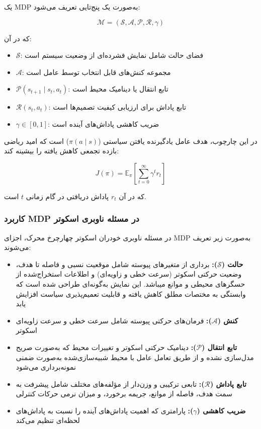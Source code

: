 یک MDP به‌صورت یک پنج‌تایی تعریف می‌شود:

\begin{equation}\label{eq:MDP}
	\mathcal{M} = (\mathcal{S}, \mathcal{A}, \mathcal{P}, \mathcal{R}, \gamma)
\end{equation}

که در آن:

\begin{itemize}
	\item $\mathcal{S}$: فضای حالت شامل نمایش فشرده‌ای از وضعیت سیستم است
	\item $\mathcal{A}$: مجموعه کنش‌های قابل انتخاب توسط عامل است
	\item $\mathcal{P}(s_{t+1} \mid s_t, a_t)$: تابع انتقال یا دینامیک محیط است
	\item $\mathcal{R}(s_t, a_t)$: تابع پاداش برای ارزیابی کیفیت تصمیم‌ها است
	\item $\gamma \in [0,1]$: ضریب کاهشی پاداش‌های آینده است
\end{itemize}

در این چارچوب، هدف عامل یادگیرنده یافتن سیاستی ($\pi(a \mid s)$) است که امید ریاضی بازده تجمعی کاهش یافته را بیشینه کند:

\begin{equation}\label{eq:cumulative_reward}
	J(\pi) = \mathbb{E}_\pi \left[ \sum_{t=0}^{\infty} \gamma^t r_t \right]
\end{equation}

که در آن $r_t$ پاداش دریافتی در گام زمانی $t$ است.

\subsubsection*{کاربرد MDP در مسئله ناوبری اسکوتر}

در مسئله ناوبری خودران اسکوتر چهارچرخ محرک، اجزای MDP به‌صورت زیر تعریف می‌شوند:

\begin{itemize}
	\item \textbf{حالت ($\mathcal{S}$):} برداری از متغیرهای پیوسته شامل موقعیت نسبی و فاصله تا هدف، وضعیت حرکتی اسکوتر (سرعت خطی و زاویه‌ای) و اطلاعات استخراج‌شده از حسگرهای محیطی و موانع میباشد. این نمایش به‌گونه‌ای طراحی شده است که وابستگی به مختصات مطلق کاهش یافته و قابلیت تعمیم‌پذیری سیاست افزایش یابد
	
	\item \textbf{کنش ($\mathcal{A}$):} فرمان‌های حرکتی پیوسته شامل سرعت خطی و سرعت زاویه‌ای اسکوتر
	
	\item \textbf{تابع انتقال ($\mathcal{P}$):} دینامیک حرکتی اسکوتر و تغییرات محیط که به‌صورت صریح مدل‌سازی نشده و از طریق تعامل عامل با محیط شبیه‌سازی‌شده به‌صورت ضمنی نمونه‌برداری می‌شود
	
	\item \textbf{تابع پاداش ($\mathcal{R}$):} تابعی ترکیبی و وزن‌دار از مؤلفه‌های مختلف شامل پیشرفت به سمت هدف، فاصله از موانع، جریمه برخورد، و میزان نرمی حرکات کنترلی
	
	\item \textbf{ضریب کاهشی ($\gamma$):} پارامتری که اهمیت پاداش‌های آینده را نسبت به پاداش‌های لحظه‌ای تنظیم می‌کند
\end{itemize}

